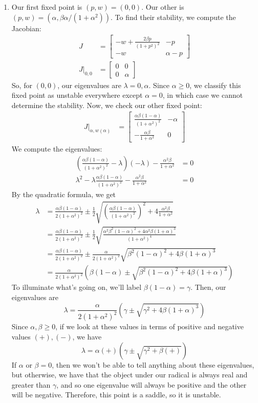 \documentclass[10pt,letterpaper]{report}
\newcommand{\mtx}[2]{\left[\begin{array}{#1}#2\end{array}\right]}
\begin{document}
\begin{enumerate}
\begin{enumerate}
    \item Our first fixed point is $(p, w) = (0, 0)$. Our other is $(p, w) = (\alpha, \beta \alpha / (1 + \alpha^2))$. To find their stability, we compute the Jacobian:
    \begin{align*}
        J &= \mtx{cc}{-w + \frac{2\beta p}{(1 + p^2)^2} & -p \\ -w & \alpha - p}
        \\
        J \big\vert_{0,0} &= \mtx{cc}{0 & 0 \\ 0 & \alpha}
    \end{align*}
    So, for $(0, 0)$, our eigenvalues are $\lambda = 0, \alpha$. Since $\alpha \geq 0$, we classify this fixed point as unstable everywhere except $\alpha = 0$, in which case we cannot determine the stability. Now, we check our other fixed point:
    \begin{align*}
        J\big\vert_{\alpha, w(\alpha)} &= \mtx{cc}{\frac{\alpha\beta(1-\alpha)}{(1 + \alpha^2)^2} & -\alpha \\ -\frac{\alpha\beta}{1 + \alpha^2} & 0}
    \end{align*}
    We compute the eigenvalues:
    \begin{align*}
        \left(\frac{\alpha\beta(1-\alpha)}{(1 + \alpha^2)^2} - \lambda\right)(-\lambda) - \frac{\alpha^2\beta}{1 + \alpha^2} &= 0 \\
        \lambda^2 - \lambda \frac{\alpha\beta(1-\alpha)}{(1 + \alpha^2)^2} - \frac{\alpha^2\beta}{1 + \alpha^2} &= 0
    \end{align*}
    By the quadratic formula, we get
    \begin{align*}
        \lambda &= \frac{\alpha\beta(1-\alpha)}{2(1 + \alpha^2)^2} \pm \frac{1}{2}\sqrt{\left(\frac{\alpha\beta(1-\alpha)}{(1 + \alpha^2)^2}\right)^2 + 4\frac{\alpha^2\beta}{1 + \alpha^2}}
        \\
        &= \frac{\alpha\beta(1-\alpha)}{2(1 + \alpha^2)^2} \pm \frac{1}{2}\sqrt{\frac{\alpha^2\beta^2(1-\alpha)^2 + 4\alpha^2\beta (1 + \alpha)^3}{(1 + \alpha^2)^4}}
        \\
        &= \frac{\alpha\beta(1-\alpha)}{2(1 + \alpha^2)^2} \pm \frac{\alpha}{2(1+\alpha^2)^2}\sqrt{\beta^2(1-\alpha)^2 + 4\beta (1 + \alpha)^3}
        \\
        &=
        \frac{\alpha}{2(1+\alpha^2)^2}\left(\beta(1-\alpha) \pm \sqrt{\beta^2(1-\alpha)^2 + 4\beta (1 + \alpha)^3}\right)
    \end{align*}
    To illuminate what's going on, we'll label $\beta(1-\alpha) = \gamma$. Then, our eigenvalues are
    \[
    \lambda = \frac{\alpha}{2(1+\alpha^2)^2}\left(\gamma \pm \sqrt{\gamma^2 + 4\beta (1 + \alpha)^3}\right)
    \]
    Since $\alpha, \beta \geq 0$, if we look at these values in terms of positive and negative values $(+), (-)$, we have
    \[
    \lambda = \alpha (+)\left(\gamma \pm \sqrt{\gamma^2 + \beta(+)}\right)
    \]
    If $\alpha$ or $\beta = 0$, then we won't be able to tell anything about these eigenvalues, but otherwise, we have that the object under our radical is always real and greater than $\gamma$, and so one eigenvalue will always be positive and the other will be negative. Therefore, this point is a saddle, so it is unstable.
    

\end{enumerate}
\end{enumerate}
\end{document}
